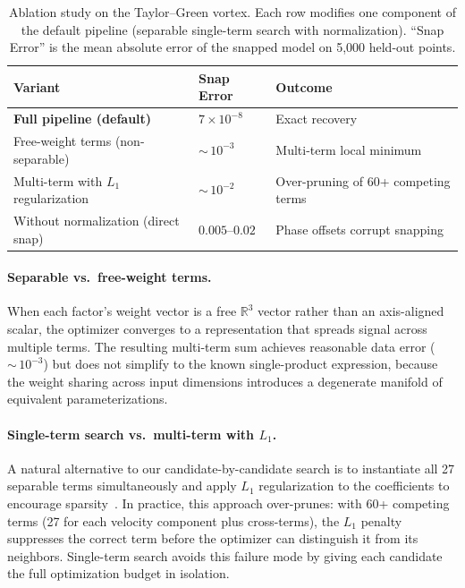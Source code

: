 \begin{table}[t]
  \centering
  \caption{Ablation study on the Taylor--Green vortex.  Each row modifies one
    component of the default pipeline (separable single-term search with
    normalization).  ``Snap Error'' is the mean absolute error of the snapped
    model on 5{,}000 held-out points.}
  \label{tab:ablation}
  \smallskip
  \begin{tabular}{@{}lll@{}}
    \toprule
    Variant & Snap Error & Outcome \\
    \midrule
    \textbf{Full pipeline (default)}
      & $7\!\times\!10^{-8}$ & Exact recovery \\
    Free-weight terms (non-separable)
      & ${\sim}\,10^{-3}$ & Multi-term local minimum \\
    Multi-term with $L_1$ regularization
      & ${\sim}\,10^{-2}$ & Over-pruning of 60+ competing terms \\
    Without normalization (direct snap)
      & $0.005$--$0.02$ & Phase offsets corrupt snapping \\
    \bottomrule
  \end{tabular}
\end{table}

\paragraph{Separable vs.\ free-weight terms.}
When each factor's weight vector is a free $\mathbb{R}^3$ vector rather than
an axis-aligned scalar, the optimizer converges to a representation that
spreads signal across multiple terms.  The resulting multi-term sum achieves
reasonable data error (${\sim}\,10^{-3}$) but does not simplify to the
known single-product expression, because the weight sharing across input
dimensions introduces a degenerate manifold of equivalent parameterizations.

\paragraph{Single-term search vs.\ multi-term with $L_1$.}
A natural alternative to our candidate-by-candidate search is to instantiate
all 27 separable terms simultaneously and apply $L_1$ regularization to the
coefficients to encourage sparsity~\citep{brunton2016}.  In practice, this
approach over-prunes: with 60+ competing terms (27 for each velocity component
plus cross-terms), the $L_1$ penalty suppresses the correct term before the
optimizer can distinguish it from its neighbors.  Single-term search avoids
this failure mode by giving each candidate the full optimization budget in
isolation.

